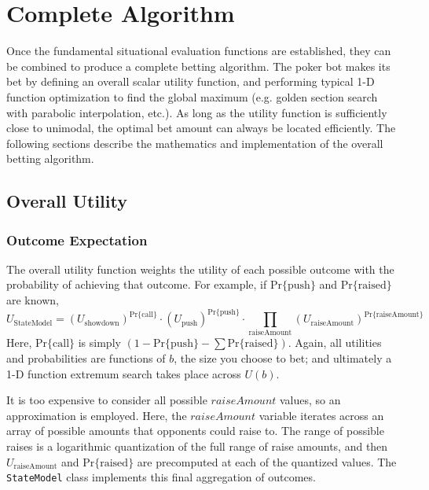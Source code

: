 


\chapter{Complete Algorithm}
\label{sec:CompleteAlgorithm}

Once the fundamental situational evaluation functions are established, they can be combined to produce a complete betting algorithm.
The poker bot makes its bet by defining an overall scalar utility function, and performing typical 1-D function optimization to find the global maximum (e.g. golden section search with parabolic interpolation, etc.).
As long as the utility function is sufficiently close to unimodal, the optimal bet amount can always be located efficiently.
The following sections describe the mathematics and implementation of the overall betting algorithm.

\section{Overall Utility}



\subsection{Outcome Expectation}
\label{sec:StateModel}

The overall utility function weights the utility of each possible outcome with the probability of achieving that outcome.
For example, if $\mathrm{Pr\{push}\}$ and $\mathrm{Pr\{raised}\}$ are known, %
\[
U_{\mathrm{StateModel}} = \left(U_{\mathrm{showdown}}\right)^{\mathrm{Pr\{call\}}} \cdot \left(U_{\mathrm{push}}\right)^{\mathrm{Pr\{push}\}} \cdot \prod_{\mathrm{raiseAmount}} \left(U_{\mathrm{raiseAmount}}\right)^{\mathrm{Pr\{raiseAmount}\}}
\]
Here, $\mathrm{Pr\{call\}}$ is simply $\left(1 - \mathrm{Pr\{push}\} - \sum \mathrm{Pr\{raised}\}\right)$.
Again, all utilities and probabilities are functions of $b$, the size you choose to bet; and ultimately a 1-D function extremum search takes place across $U\left(b\right)$.

It is too expensive to consider all possible $raiseAmount$ values, so an approximation is employed.
Here, the $raiseAmount$ variable iterates across an array of possible amounts that opponents could raise to.
The range of possible raises is a logarithmic quantization of the full range of raise amounts, and then $U_{\mathrm{raiseAmount}}$ and $\mathrm{Pr\{raised}\}$ are precomputed at each of the quantized values.
The \texttt{StateModel} class implements this final aggregation of outcomes.

